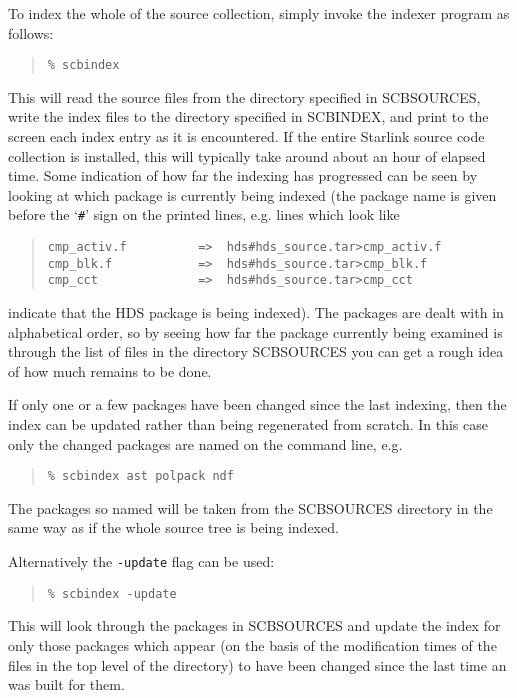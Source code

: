 \documentclass[twoside,11pt]{article}
\renewcommand{\_}{\texttt{\symbol{95}}}
\begin{document}
To index the whole of the source collection, simply invoke the 
indexer program as follows:
\begin{quote}
\begin{verbatim}
% scbindex
\end{verbatim}
\end{quote}
This will 
read the source files from the directory specified in SCB\_SOURCES, 
write the index files to the directory specified in SCB\_INDEX,
and print to the screen each index entry as it is encountered.
If the entire Starlink source code collection is installed, 
this will typically take around about an hour of elapsed time. 
Some indication of how far the indexing
has progressed can be seen by looking at which package is currently
being indexed (the package name is given before the `{\tt \#}' sign on the 
printed lines, e.g. lines which look like
\begin{quote}
\begin{verbatim}
cmp_activ.f          =>  hds#hds_source.tar>cmp_activ.f
cmp_blk.f            =>  hds#hds_source.tar>cmp_blk.f
cmp_cct              =>  hds#hds_source.tar>cmp_cct
\end{verbatim}
\end{quote}
indicate that the HDS package is being indexed).
The packages are dealt with in alphabetical order, so by seeing how 
far the package currently being examined is through the list of files
in the directory SCB\_SOURCES you can get a rough idea of how much remains
to be done.

If only one or a few packages have been changed
since the last indexing,
then the index can be updated rather than being regenerated from scratch.
In this case only the changed packages are named on the command line,
e.g.
\begin{quote}
\begin{verbatim}
% scbindex ast polpack ndf
\end{verbatim}
\end{quote}
The packages so named will be taken from the SCB\_SOURCES directory in
the same way as if the whole source tree is being indexed.

Alternatively the {\tt -update} flag can be used:
\begin{quote}
\begin{verbatim}
% scbindex -update
\end{verbatim}
\end{quote}
This will look through the packages in SCB\_SOURCES and update the index
for only those packages which appear (on the basis of the modification
times of the files in the top level of the directory) to have been 
changed since the last time an was built for them.
\end{document}
